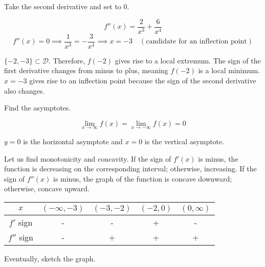 \documentclass{article}
\begin{document}
\noindent Take the second derivative and set to 0.

\[f''(x)=\frac{2}{x^3}+\frac{6}{x^4}\]
\[f''(x)=0\implies\frac{1}{x^3}=-\frac{3}{x^4}\implies x=-3\quad(\text{candidate for an inflection point})\]

\hfill

\noindent $\{-2,-3\}\subset\mathcal D$. Therefore, $f(-2)$ gives rise to a local extremum. The sign of the first derivative changes from minus to plus, meaning $f(-2)$ is a local minimum. $x=-3$ gives rise to an inflection point because the sign of the second derivative also changes.

\hfill

\noindent Find the asymptotes.

\[\lim_{x\to\infty}f(x)=\lim_{x\to-\infty}f(x)=0\]

\hfill

\noindent $y=0$ is the horizontal asymptote and $x=0$ is the vertical asymptote.

\hfill

\noindent Let us find monotonicity and concavity. If the sign of $f'(x)$ is minus, the function is decreasing on the corresponding interval; otherwise, increasing. If the sign of $f''(x)$ is minus, the graph of the function is concave downward; otherwise, concave upward.

\begin{center}
    \large
    \begin{tabular}{ |c| c c c c| } 
    \hline
        $x$ & $(-\infty, -3)$ & $(-3, -2)$ & $(-2, 0)$ &  $(0, \infty)$ \\
        \hline
        $f'$ sign & - & - & + & - \\
        \hline
        $f''$ sign & - & + & + & + \\
        \hline
    \end{tabular}
\end{center}

\hfill

\noindent Eventually, sketch the graph.

\begin{center}
\end{center}
\end{document}
